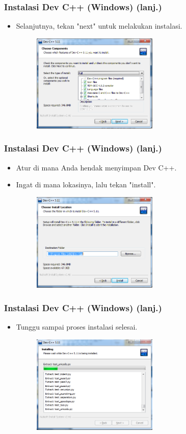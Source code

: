 \begin{frame}
\frametitle{Instalasi Dev C++ (Windows) (lanj.)}
\begin{itemize}
  \item Selanjutnya, tekan "next" untuk melakukan instalasi.
  \begin{figure}
    \includegraphics[width=6cm]{asset/devcpp-3.png}
  \end{figure}
\end{itemize}
\end{frame}

\begin{frame}
\frametitle{Instalasi Dev C++ (Windows) (lanj.)}
\begin{itemize}
  \item Atur di mana Anda hendak menyimpan Dev C++.
  \item Ingat di mana lokasinya, lalu tekan "install".
  \begin{figure}
    \includegraphics[width=6cm]{asset/devcpp-4.png}
  \end{figure}
\end{itemize}
\end{frame}

\begin{frame}
\frametitle{Instalasi Dev C++ (Windows) (lanj.)}
\begin{itemize}
  \item Tunggu sampai proses instalasi selesai.
  \begin{figure}
    \includegraphics[width=6cm]{asset/devcpp-5.png}
  \end{figure}
\end{itemize}
\end{frame}


